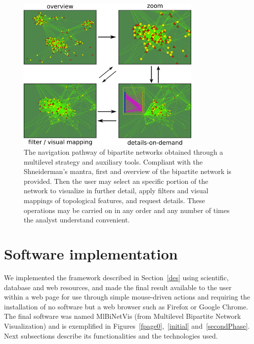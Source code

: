\documentclass[runningheads]{llncs}
\begin{document}
\begin{figure}\centering
 \includegraphics[width=0.8\textwidth]{fnav___}
  \caption{The navigation pathway of bipartite networks obtained through a multilevel strategy
  and auxiliary tools.
  Compliant with the Shneiderman's mantra, first and overview of the bipartite network is provided.
  Then the user may select an specific portion of the network to visualize in further detail,
  apply filters and visual mappings of topological features, and request details.
  These operations may be carried on in any order and any number of times the analyst understand convenient.
  }\label{fnav}
\end{figure}

\noindent 
\section{Software implementation}\label{sof}
We implemented the framework described in Section~\ref{des} using scientific,
database and web resources,
and made the final result available to the user within a web page
for use through simple mouse-driven actions
and requiring the installation of no software but a web browser such as Firefox or Google Chrome.
The final software was named MlBiNetVis (from Multilevel Bipartite Network Visualization)
and is exemplified in Figures~\ref{fpage0},~\ref{initial} and~\ref{secondPhase}.
Next subsections describe its functionalities and the technologies used.
\end{document}
